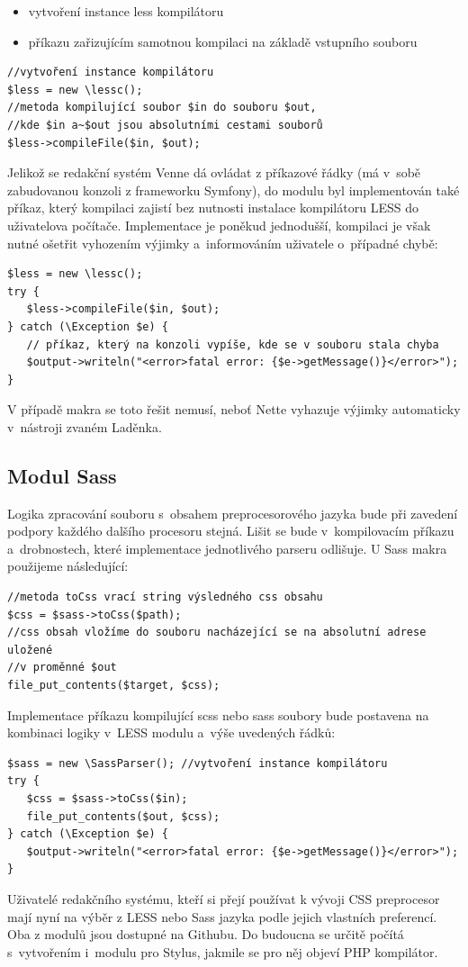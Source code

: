 \documentclass[thesis=B,czech]{FITthesis}[2012/06/26]
\begin{document}
\begin{itemize}
 \item vytvoření instance less kompilátoru
 \item příkazu zařizujícím samotnou kompilaci na základě vstupního souboru
\end{itemize}
\scriptsize
\begin{verbatim}
//vytvoření instance kompilátoru
$less = new \lessc(); 
//metoda kompilující soubor $in do souboru $out, 
//kde $in a~$out jsou absolutními cestami souborů
$less->compileFile($in, $out); 
\end{verbatim}
\normalsize
Jelikož se redakční systém Venne dá ovládat z příkazové řádky (má v~sobě zabudovanou konzoli z frameworku Symfony), do modulu byl implementován také příkaz, který kompilaci zajistí bez nutnosti instalace kompilátoru LESS do uživatelova počítače. Implementace je poněkud jednodušší, kompilaci je však nutné ošetřit vyhozením výjimky a~informováním uživatele o~případné chybě:
\scriptsize
\begin{verbatim}
$less = new \lessc();
try {
   $less->compileFile($in, $out);
} catch (\Exception $e) {
   // příkaz, který na konzoli vypíše, kde se v souboru stala chyba
   $output->writeln("<error>fatal error: {$e->getMessage()}</error>"); 
}
\end{verbatim}
\normalsize
V případě makra se toto řešit nemusí, neboť Nette vyhazuje výjimky automaticky v~nástroji zvaném Laděnka.



\subsection{Modul Sass}

Logika zpracování souboru s~obsahem preprocesorového jazyka bude při zavedení podpory každého dalšího procesoru stejná. Lišit se bude v~kompilovacím příkazu a~drobnostech, které implementace jednotlivého parseru odlišuje. U Sass makra použijeme následující:	

\scriptsize
\begin{verbatim}
//metoda toCss vrací string výsledného css obsahu
$css = $sass->toCss($path); 
//css obsah vložíme do souboru nacházející se na absolutní adrese uložené 
//v proměnné $out
file_put_contents($target, $css);  
\end{verbatim}
\normalsize
Implementace příkazu kompilující scss nebo sass soubory bude postavena na kombinaci logiky v~LESS modulu a~výše uvedených řádků:
\scriptsize
\begin{verbatim}
$sass = new \SassParser(); //vytvoření instance kompilátoru
try {
   $css = $sass->toCss($in); 	
   file_put_contents($out, $css);
} catch (\Exception $e) {
   $output->writeln("<error>fatal error: {$e->getMessage()}</error>");
}
\end{verbatim}
\normalsize
Uživatelé redakčního systému, kteří si přejí používat k vývoji CSS preprocesor mají nyní na výběr z LESS nebo Sass jazyka podle jejich vlastních preferencí. Oba z modulů jsou dostupné na Githubu. Do budoucna se určitě počítá s~vytvořením i~modulu pro Stylus, jakmile se pro něj objeví PHP kompilátor.
\end{document}
